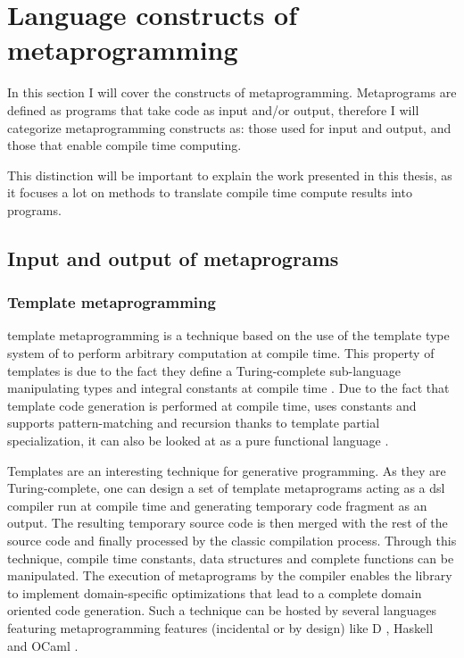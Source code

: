 \documentclass[../main]{subfiles}
\begin{document}
\section{
  Language constructs of \cpp metaprogramming
}

In this section I will cover the constructs of \cpp metaprogramming.
Metaprograms are defined as programs that take code as input and/or output,
therefore I will categorize metaprogramming constructs as:
those used for input and output,
and those that enable compile time computing.

This distinction will be important to explain the work presented in
this thesis, as it focuses a lot on methods to translate
compile time compute results into \cpp programs.

\subsection{
  Input and output of metaprograms
}

\subsubsection{
  Template metaprogramming
}

\cpp template metaprogramming \cite{abrahams:2004} is a technique based on the
use of the template type system of \cpp to perform arbitrary computation at
compile time. This property of \cpp templates is due to the fact they
define a Turing-complete sub-language manipulating types and integral constants
at compile time \cite{unruh:1994}. Due to the fact that template code generation
is performed at compile time, uses constants and supports pattern-matching and
recursion thanks to template partial specialization, it can also be looked
at as a pure functional language \cite{haeri:2012}.

Templates are an interesting technique for generative programming. As they
are Turing-complete, one can design a set of template metaprograms acting as a
\gls{dsl} compiler run at compile time and generating temporary \cpp code
fragment as an output. The resulting temporary source code is then merged with
the rest of the source code and finally processed by the classic
compilation process. Through this technique, compile time constants,
data structures and complete functions can be manipulated.
The execution of metaprograms by the compiler enables the library to implement
domain-specific optimizations that lead to a complete domain oriented
code generation. Such a technique can be hosted by several languages featuring
metaprogramming features (incidental or by design) like D \cite{template:dlang},
Haskell \cite{sheard:2002} and OCaml \cite{serot:2008}.
\end{document}
